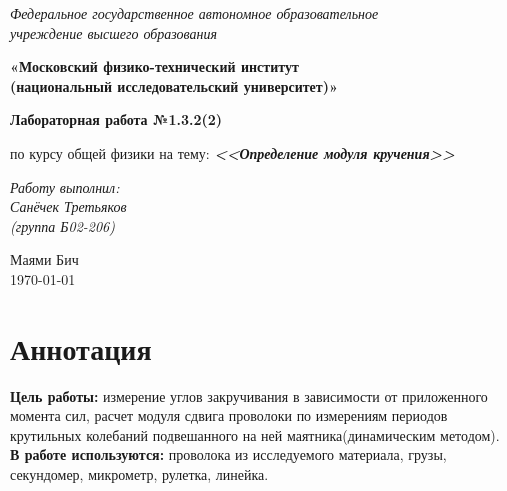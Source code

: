 \documentclass[a4paper,14pt]{extarticle}
\begin{document}
	\begin{center}
		\textit{Федеральное государственное автономное образовательное\\ учреждение высшего образования }
		
		\vspace{0.5ex}
		
		\textbf{«Московский физико-технический институт\\ (национальный исследовательский университет)»}
	\end{center}
	
	\vspace{10ex}
	

	\begin{center}
		\vspace{13ex}	
		\textbf{Лабораторная работа №1.3.2(2)}	
		\vspace{1ex}
	
		по курсу общей физики		
		на тему:		
		\textbf{\textit{<<Определение модуля кручения>>}}		
		\vspace{30ex}

	\begin{flushright}
		\noindent
		\textit{Работу выполнил:}\\  
		\textit{Санёчек Третьяков  \\(группа Б02-206)}
	\end{flushright}
	\vfill
	Маями Бич \\ \today

\end{center}
\newpage
	\section{Аннотация}
	\textbf{Цель работы:} измерение углов закручивания в зависимости от приложенного момента сил, расчет модуля сдвига проволоки по измерениям периодов крутильных колебаний подвешанного на ней 	маятника(динамическим методом).\\
	\textbf{В работе используются:} проволока из исследуемого материала, грузы, секундомер, микрометр, рулетка, линейка.
\end{document}
